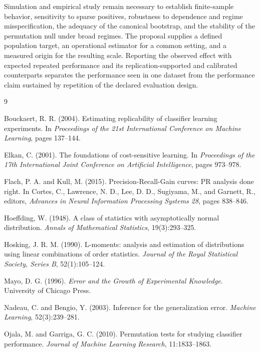 \documentclass[11pt]{article}
\theoremstyle{remark}
\begin{document}
Simulation and empirical study remain necessary to establish finite-sample behavior, sensitivity to sparse positives, robustness to dependence and regime misspecification, the adequacy of the canonical bootstrap, and the stability of the permutation null under broad regimes. The proposal supplies a defined population target, an operational estimator for a common setting, and a measured origin for the resulting scale. Reporting the observed effect with expected repeated performance and its replication-supported and calibrated counterparts separates the performance seen in one dataset from the performance claim sustained by repetition of the declared evaluation design.

\newpage

\begin{thebibliography}{9}

Bouckaert, R. R. (2004).
Estimating replicability of classifier learning experiments.
In \emph{Proceedings of the 21st International Conference on Machine Learning}, pages 137--144.

Elkan, C. (2001).
The foundations of cost-sensitive learning.
In \emph{Proceedings of the 17th International Joint Conference on Artificial Intelligence}, pages 973--978.

Flach, P. A. and Kull, M. (2015).
Precision-Recall-Gain curves: PR analysis done right.
In Cortes, C., Lawrence, N. D., Lee, D. D., Sugiyama, M., and Garnett, R., editors,
\emph{Advances in Neural Information Processing Systems 28}, pages 838--846.

Hoeffding, W. (1948).
A class of statistics with asymptotically normal distribution.
\emph{Annals of Mathematical Statistics}, 19(3):293--325.

Hosking, J. R. M. (1990).
L-moments: analysis and estimation of distributions using linear combinations of order statistics.
\emph{Journal of the Royal Statistical Society, Series B}, 52(1):105--124.

Mayo, D. G. (1996).
\emph{Error and the Growth of Experimental Knowledge}.
University of Chicago Press.

Nadeau, C. and Bengio, Y. (2003).
Inference for the generalization error.
\emph{Machine Learning}, 52(3):239--281.

Ojala, M. and Garriga, G. C. (2010).
Permutation tests for studying classifier performance.
\emph{Journal of Machine Learning Research}, 11:1833--1863.


\end{thebibliography}
\end{document}
